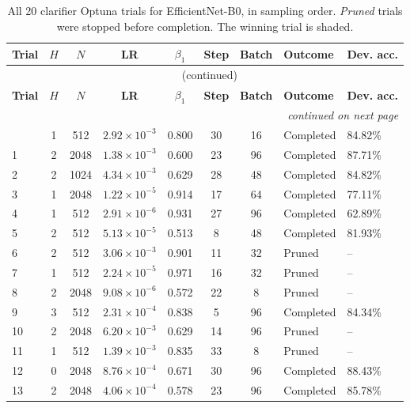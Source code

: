 {\footnotesize
\begin{longtable}{lccccccll}
\caption{All 20 clarifier Optuna trials for EfficientNet-B0, in sampling order. \emph{Pruned} trials were stopped before completion. The winning trial is shaded.}
\label{tab:trials_effnetb0} \\
\toprule
\textbf{Trial} & \textbf{$H$} & \textbf{$N$} & \textbf{LR} & \textbf{$\beta_1$} & \textbf{Step} & \textbf{Batch} & \textbf{Outcome} & \textbf{Dev. acc.} \\
\midrule
\endfirsthead
\multicolumn{9}{c}{\tablename\ \thetable{} (continued)} \\
\toprule
\textbf{Trial} & \textbf{$H$} & \textbf{$N$} & \textbf{LR} & \textbf{$\beta_1$} & \textbf{Step} & \textbf{Batch} & \textbf{Outcome} & \textbf{Dev. acc.} \\
\midrule
\endhead
\midrule
\multicolumn{9}{r}{\emph{continued on next page}} \\
\endfoot
\bottomrule
\endlastfoot
0 & 1 & 512 & $2.92\times10^{-3}$ & 0.800 & 30 & 16 & Completed & 84.82\% \\
1 & 2 & 2048 & $1.38\times10^{-3}$ & 0.600 & 23 & 96 & Completed & 87.71\% \\
2 & 2 & 1024 & $4.34\times10^{-3}$ & 0.629 & 28 & 48 & Completed & 84.82\% \\
3 & 1 & 2048 & $1.22\times10^{-5}$ & 0.914 & 17 & 64 & Completed & 77.11\% \\
4 & 1 & 512 & $2.91\times10^{-6}$ & 0.931 & 27 & 96 & Completed & 62.89\% \\
5 & 2 & 512 & $5.13\times10^{-5}$ & 0.513 & 8 & 48 & Completed & 81.93\% \\
6 & 2 & 512 & $3.06\times10^{-3}$ & 0.901 & 11 & 32 & Pruned & -- \\
7 & 1 & 512 & $2.24\times10^{-5}$ & 0.971 & 16 & 32 & Pruned & -- \\
8 & 2 & 2048 & $9.08\times10^{-6}$ & 0.572 & 22 & 8 & Pruned & -- \\
9 & 3 & 512 & $2.31\times10^{-4}$ & 0.838 & 5 & 96 & Completed & 84.34\% \\
10 & 2 & 2048 & $6.20\times10^{-3}$ & 0.629 & 14 & 96 & Pruned & -- \\
11 & 1 & 512 & $1.39\times10^{-3}$ & 0.835 & 33 & 8 & Pruned & -- \\
\rowcolor{gray!15} 12 & 0 & 2048 & $8.76\times10^{-4}$ & 0.671 & 30 & 96 & Completed & 88.43\% \\
13 & 2 & 2048 & $4.06\times10^{-4}$ & 0.578 & 23 & 96 & Completed & 85.78\% \\

\end{longtable}}

